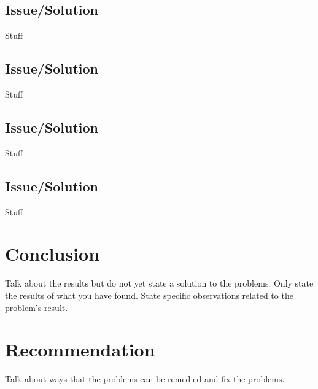 \subsection{Issue/Solution}
Stuff

\subsection{Issue/Solution}
Stuff

\subsection{Issue/Solution}
Stuff

\subsection{Issue/Solution}
Stuff
\newpage


\section{Conclusion}
Talk about the results but do not yet state a solution to the problems.  Only state the results of what you have found.  State specific observations related to the problem's result.

\section{Recommendation}	
Talk about ways that the problems can be remedied and fix the problems.
